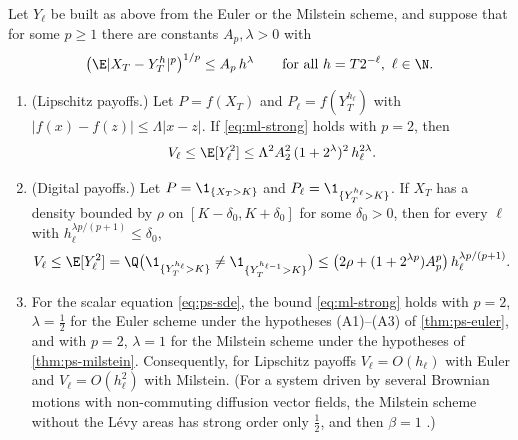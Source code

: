 \begin{proposition}\label{prop:ml-variance-decay}
Let $Y_\ell$ be built as above from the Euler or the Milstein scheme, and suppose that for some
$p\ge1$ there are constants $A_p,\lambda>0$ with
\begin{equation}\label{eq:ml-strong}
  \big(\E|X_T-Y^h_T|^p\big)^{1/p}\le A_p\,h^\lambda\qquad\text{for all }h=T2^{-\ell},\ \ell\in\N .
\end{equation}
\begin{enumerate}[label=(\roman*)]
  \item (Lipschitz payoffs.) Let $P=f(X_T)$ and $P_\ell=f(Y^{h_\ell}_T)$ with
    $|f(x)-f(z)|\le\Lambda|x-z|$. If \eqref{eq:ml-strong} holds with $p=2$, then
    \[
      V_\ell\le\E[Y_\ell^2]\le\Lambda^2A_2^2\,(1+2^\lambda)^2\,h_\ell^{2\lambda}.
    \]
  \item (Digital payoffs.) Let $P=\1_{\{X_T>K\}}$ and $P_\ell=\1_{\{Y^{h_\ell}_T>K\}}$. If $X_T$
    has a density bounded by $\rho$ on $[K-\delta_0,K+\delta_0]$ for some $\delta_0>0$, then for
    every $\ell$ with $h_\ell^{\lambda p/(p+1)}\le\delta_0$,
    \[
      V_\ell\le\E[Y_\ell^2]=\Q\big(\1_{\{Y^{h_\ell}_T>K\}}\ne\1_{\{Y^{h_{\ell-1}}_T>K\}}\big)
      \le\big(2\rho+(1+2^{\lambda p})A_p^p\big)\,h_\ell^{\lambda p/(p+1)} .
    \]
  \item For the scalar equation \eqref{eq:ps-sde}, the bound \eqref{eq:ml-strong} holds with $p=2$,
    $\lambda=\frac12$ for the Euler scheme under the hypotheses (A1)--(A3) of \cref{thm:ps-euler},
    and with $p=2$, $\lambda=1$ for the Milstein scheme under the hypotheses of
    \cref{thm:ps-milstein}. Consequently, for Lipschitz payoffs $V_\ell=O(h_\ell)$ with Euler and
    $V_\ell=O(h_\ell^2)$ with Milstein. (For a system driven by several Brownian motions with
    non-commuting diffusion vector fields, the Milstein scheme without the L\'evy areas has strong
    order only $\frac12$, and then $\beta=1$ \citep{giles-szpruch}.)
\end{enumerate}
\end{proposition}

